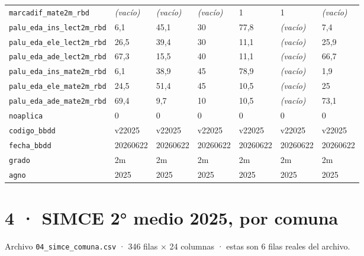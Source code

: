 \documentclass[10pt]{article}
\begin{document}
\begin{xltabular}{\linewidth}{@{}p{4.3cm} Y Y Y Y Y Y @{}}
\texttt{marcadif\_\allowbreak{}mate2m\_\allowbreak{}rbd} & \textit{\color{gris}(vacío)} & \textit{\color{gris}(vacío)} & \textit{\color{gris}(vacío)} & 1 & 1 & \textit{\color{gris}(vacío)} \\
\texttt{palu\_\allowbreak{}eda\_\allowbreak{}ins\_\allowbreak{}lect2m\_\allowbreak{}rbd} & 6,1 & 45,1 & 30 & 77,8 & \textit{\color{gris}(vacío)} & 7,4 \\
\texttt{palu\_\allowbreak{}eda\_\allowbreak{}ele\_\allowbreak{}lect2m\_\allowbreak{}rbd} & 26,5 & 39,4 & 30 & 11,1 & \textit{\color{gris}(vacío)} & 25,9 \\
\texttt{palu\_\allowbreak{}eda\_\allowbreak{}ade\_\allowbreak{}lect2m\_\allowbreak{}rbd} & 67,3 & 15,5 & 40 & 11,1 & \textit{\color{gris}(vacío)} & 66,7 \\
\texttt{palu\_\allowbreak{}eda\_\allowbreak{}ins\_\allowbreak{}mate2m\_\allowbreak{}rbd} & 6,1 & 38,9 & 45 & 78,9 & \textit{\color{gris}(vacío)} & 1,9 \\
\texttt{palu\_\allowbreak{}eda\_\allowbreak{}ele\_\allowbreak{}mate2m\_\allowbreak{}rbd} & 24,5 & 51,4 & 45 & 10,5 & \textit{\color{gris}(vacío)} & 25 \\
\texttt{palu\_\allowbreak{}eda\_\allowbreak{}ade\_\allowbreak{}mate2m\_\allowbreak{}rbd} & 69,4 & 9,7 & 10 & 10,5 & \textit{\color{gris}(vacío)} & 73,1 \\
\texttt{noaplica} & 0 & 0 & 0 & 0 & 0 & 0 \\
\texttt{codigo\_\allowbreak{}bbdd} & v22025 & v22025 & v22025 & v22025 & v22025 & v22025 \\
\texttt{fecha\_\allowbreak{}bbdd} & 20260622 & 20260622 & 20260622 & 20260622 & 20260622 & 20260622 \\
\texttt{grado} & 2m & 2m & 2m & 2m & 2m & 2m \\
\texttt{agno} & 2025 & 2025 & 2025 & 2025 & 2025 & 2025 \\
\end{xltabular}
\normalsize

\clearpage
\hypertarget{base4}{}
\section{4 · SIMCE 2° medio 2025, por comuna}
\small Archivo \texttt{04\_simce\_comuna.csv} · 346 filas × 24 columnas · estas son 6 filas reales del archivo.\normalsize
\end{document}
